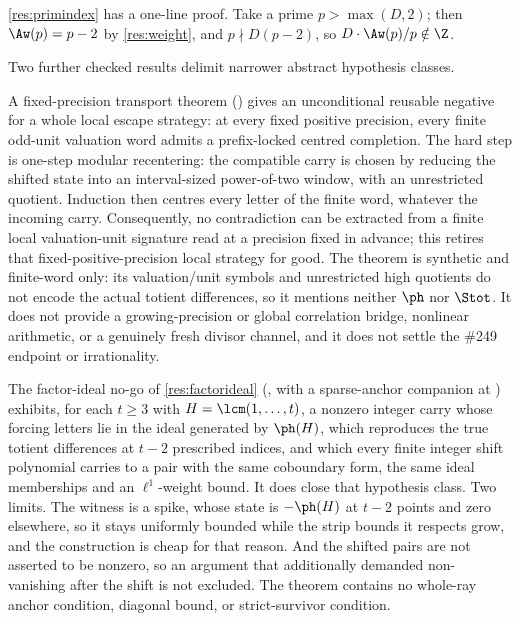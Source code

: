 \ref{res:primindex} has a one-line proof.  Take a prime
$p>\max(D,2)$; then $\Aw(p)=p-2$ by \ref{res:weight}, and $p\nmid D(p-2)$, so
$D\cdot\Aw(p)/p\notin\Z$.

Two further checked results delimit narrower abstract hypothesis classes.

A fixed-precision transport theorem
()
gives an unconditional reusable negative for a whole local escape strategy:
at every fixed positive precision, every finite odd-unit valuation word admits
a prefix-locked centred completion.  The hard step is one-step modular
recentering: the compatible carry is chosen by reducing the shifted state into
an interval-sized power-of-two window, with an unrestricted quotient.  Induction
then centres every letter of the finite word, whatever the incoming carry.
Consequently, no contradiction can be extracted from a finite local
valuation-unit signature read at a precision fixed in advance; this retires
that fixed-positive-precision local strategy for good.  The theorem is
synthetic and finite-word only: its valuation/unit symbols and unrestricted
high quotients do not encode the actual totient differences, so it mentions
neither $\ph$ nor $\Stot$.  It does not provide a growing-precision or global
correlation bridge, nonlinear arithmetic, or a genuinely fresh divisor channel,
and it does not settle the \#249 endpoint or irrationality.

The factor-ideal no-go of \ref{res:factorideal}
(,
with a sparse-anchor companion at
)
exhibits, for each $t\ge3$ with $H=\lcm(1,\dots,t)$, a nonzero integer carry
whose forcing letters lie in the ideal generated by $\ph(H)$, which reproduces
the true totient differences at $t-2$ prescribed indices, and which every
finite integer shift polynomial carries to a pair with the same coboundary
form, the same ideal memberships and an $\ell^1$-weight bound.  It does close
that hypothesis class.  Two limits.  The witness is a spike, whose state is
$-\ph(H)$ at $t-2$ points and zero elsewhere, so it stays uniformly bounded
while the strip bounds it respects grow, and the construction is cheap for
that reason.  And the shifted pairs are not asserted to be nonzero, so an
argument that additionally demanded non-vanishing after the shift is not
excluded.  The theorem contains no whole-ray anchor condition, diagonal bound,
or strict-survivor condition.



